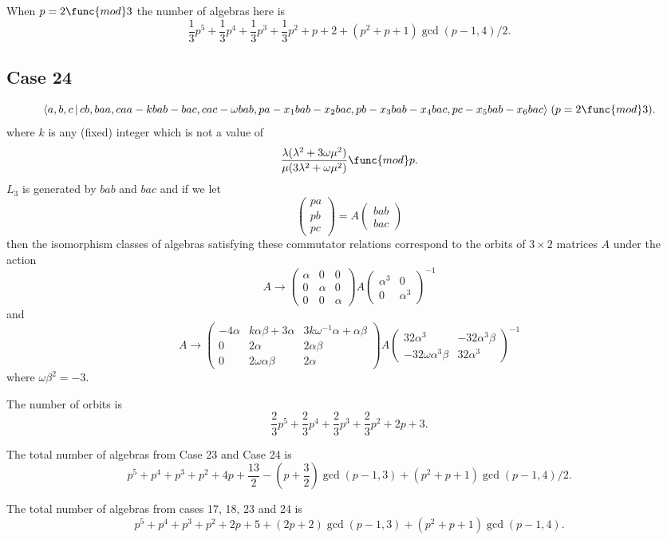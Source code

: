 \documentclass[10pt,thmsa]{article}
\begin{document}
When $p=2\func{mod}3$ the number of algebras here is 
\[
\allowbreak \frac{1}{3}p^{5}+\frac{1}{3}p^{4}+\frac{1}{3}p^{3}+\frac{1}{3}%
p^{2}+p+2+(p^{2}+p+1)\gcd (p-1,4)/2. 
\]

\subsection{Case 24}

\[
\langle a,b,c\,|\,cb,baa,caa-kbab-bac,cac-\omega
bab,pa-x_{1}bab-x_{2}bac,pb-x_{3}bab-x_{4}bac,pc-x_{5}bab-x_{6}bac\rangle
\;(p=2\func{mod}3). 
\]%
where $k$ is any (fixed) integer which is not a value of 
\[
\frac{\lambda (\lambda ^{2}+3\omega \mu ^{2})}{\mu (3\lambda ^{2}+\omega \mu
^{2})}\func{mod}p. 
\]%
$L_{3}$ is generated by $bab$ and $bac$ and if we let 
\[
\left( 
\begin{array}{l}
pa \\ 
pb \\ 
pc%
\end{array}%
\right) =A\left( 
\begin{array}{l}
bab \\ 
bac%
\end{array}%
\right) 
\]%
then the isomorphism classes of algebras satisfying these commutator
relations correspond to the orbits of $3\times 2$ matrices $A$ under the
action 
\[
A\rightarrow \left( 
\begin{array}{lll}
\alpha & 0 & 0 \\ 
0 & \alpha & 0 \\ 
0 & 0 & \alpha%
\end{array}%
\right) A\left( 
\begin{array}{ll}
\alpha ^{3} & 0 \\ 
0 & \alpha ^{3}%
\end{array}%
\right) ^{-1} 
\]%
and 
\[
A\rightarrow \left( 
\begin{array}{lll}
-4\alpha & k\alpha \beta +3\alpha & 3k\omega ^{-1}\alpha +\alpha \beta \\ 
0 & 2\alpha & 2\alpha \beta \\ 
0 & 2\omega \alpha \beta & 2\alpha%
\end{array}%
\right) A\left( 
\begin{array}{ll}
32\alpha ^{3} & -32\alpha ^{3}\beta \\ 
-32\omega \alpha ^{3}\beta & 32\alpha ^{3}%
\end{array}%
\right) ^{-1} 
\]%
where $\omega \beta ^{2}=-3$.

The number of orbits is 
\[
\allowbreak \frac{2}{3}p^{5}+\frac{2}{3}p^{4}+\frac{2}{3}p^{3}+\frac{2}{3}%
p^{2}+2p+3. 
\]

The total number of algebras from Case 23 and Case 24 is 
\[
p^{5}+p^{4}+p^{3}+p^{2}+4p+\frac{13}{2}-(p+\frac{3}{2})\gcd
(p-1,3)+(p^{2}+p+1)\gcd (p-1,4)/2. 
\]

The total number of algebras from cases 17, 18, 23 and 24 is 
\[
p^5+p^4+p^3+p^2+2p+5+(2p+2)\gcd (p-1,3)+(p^2+p+1)\gcd (p-1,4). 
\]
\end{document}
